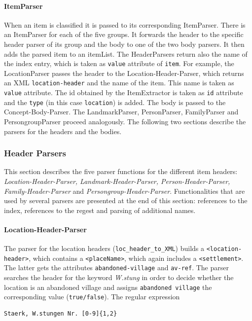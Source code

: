 \paragraph{ItemParser}
When an item is classified it is passed to its corresponding
ItemParser. There is an ItemParser for each of the five groups. It
forwards the header to the specific header parser of its group and the
body to one of the two body parsers. It then adds the parsed item to
an itemList. The HeaderParsers return also the name of the index
entry, which is taken as \texttt{value} attribute of \texttt{item}.
For example, the LocationParser passes the header to the
Location-Header-Parser, which returns an XML \texttt{location-header}
and the name of the item. This name is taken as \texttt{value}
attribute. The id obtained by the ItemExtractor is taken as
\texttt{id} attribute and the \texttt{type} (in this case
\texttt{location}) is added. The body is passed to the
Concept-Body-Parser. The LandmarkParser, PersonParser, FamilyParser
and PersongroupParser proceed analogously. The following two sections
describe the parsers for the headers and the bodies.


\subsubsection{Header Parsers}
This section describes the five parser functions for the different
item headers: \textit{Location-Header-Parser, Landmark-Header-Parser,
  Person-Header-Parser, Family-Header-Parser} and
\textit{Persongroup-Header-Parser}. Functionalities that are used by
several parsers are presented at the end of this section: references
to the index, references to the regest and parsing of additional
names.

\paragraph{Location-Header-Parser}
The parser for the location headers (\texttt{loc\_header\_to\_XML})
builds a \texttt{<location-header>}, which contains a
\texttt{<placeName>}, which again includes a \texttt{<settlement>}.
The latter gets the attributes \texttt{abandoned-village} and
\texttt{av-ref}. The parser searches the header for the keyword
\textit{W.stung} in order to decide whether the location is an
abandoned village and assigns \texttt{abandoned village} the
corresponding value (\texttt{true/false}). The regular expression

\begin{verbatim}
Staerk, W.stungen Nr. [0-9]{1,2}
\end{verbatim}

